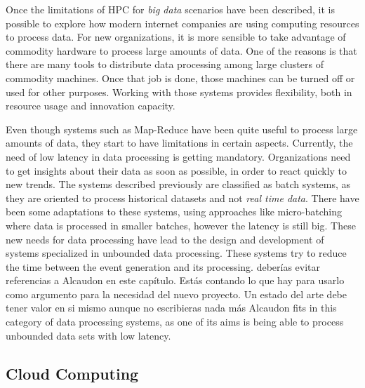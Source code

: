 Once the limitations of HPC for \textit{big data} scenarios have been described,
it is possible to explore how modern internet companies are using computing
resources to process data. For new organizations, it is more sensible to take
advantage of commodity hardware to process large amounts of data. One of the
reasons is that there are many tools to distribute data processing among large
clusters of commodity machines. Once that job is done, those machines can be
turned off or used for other purposes. Working with those systems provides
flexibility, both in resource usage and innovation capacity.

Even though systems such as Map-Reduce have been quite useful to
process large amounts of data, they start to have limitations in
certain aspects. Currently, the need of low latency in data processing
is getting mandatory. Organizations need to get insights about their
data as soon as possible, in order to react quickly to new trends. The
systems described previously are classified as batch systems, as they
are oriented to process historical datasets and not \textit{real time
  data}. There have been some adaptations to these systems, using
approaches like micro-batching where data is processed in smaller
batches, however the latency is still big. These new needs for data
processing have lead to the design and development of systems
specialized in unbounded data processing. These systems try to reduce
the time between the event generation and its processing. \FIXME
{deberías evitar referencias a Alcaudon en este capítulo. Estás
  contando lo que hay para usarlo como argumento para la necesidad del
  nuevo proyecto. Un estado del arte debe tener valor en si mismo
  aunque no escribieras nada más} Alcaudon fits in this category of
data processing systems, as one of its aims is being able to process
unbounded data sets with low latency.

\subsection{Cloud Computing}


